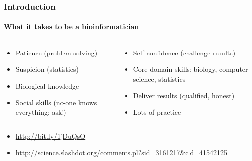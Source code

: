\documentclass[table]{beamer}
\begin{document}
  \begin{frame}
    \frametitle{Introduction}
    \framesubtitle{What it takes to be a bioinformatician}
    \begin{columns}[t]
	  \begin{column}{5cm}
        \begin{itemize}
          \item Patience (problem-solving)
          \item Suspicion (statistics)
          \item Biological knowledge
          \item Social skills (no-one knows everything: ask!)
	    \end{itemize}
	  \end{column}
	  \begin{column}{5cm}
	    \begin{itemize}
	      \item Self-confidence (challenge results)
	      \item Core domain skills: biology, computer science, statistics
	      \item Deliver results (qualified, honest)
	      \item Lots of practice
		\end{itemize}
	  \end{column}
	\end{columns}
	\begin{itemize}
	  \item \url{http://bit.ly/1jDuQsO}
	  \item \url{http://science.slashdot.org/comments.pl?sid=3161217&cid=41542125}
	\end{itemize}
  \end{frame}
\end{document}
